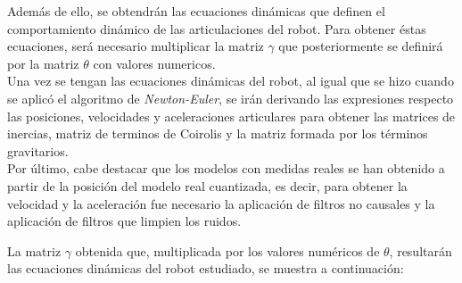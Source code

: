 	Además de ello, se obtendrán las ecuaciones dinámicas que definen el comportamiento dinámico de las articulaciones del robot. Para obtener éstas ecuaciones, será necesario multiplicar la matriz $\gamma$ que posteriormente se definirá por la matriz $\theta$ con valores numericos. \\
	Una vez se tengan las ecuaciones dinámicas del robot, al igual que se hizo cuando se aplicó el algoritmo de \textit{Newton-Euler}, se irán derivando las expresiones respecto las posiciones, velocidades y aceleraciones articulares para obtener las matrices de inercias, matriz de terminos de Coirolis y la matriz formada por los términos gravitarios.\\

	Por último, cabe destacar que los modelos con medidas reales se han obtenido a partir de la posición del modelo real cuantizada, es decir, para obtener la velocidad y la aceleración fue necesario la aplicación de filtros no causales y la aplicación de filtros que limpien los ruidos.


La matriz $\gamma$ obtenida que, multiplicada por los valores numéricos de $\theta$, resultarán las ecuaciones dinámicas del robot estudiado, se muestra a continuación:


\newpage
